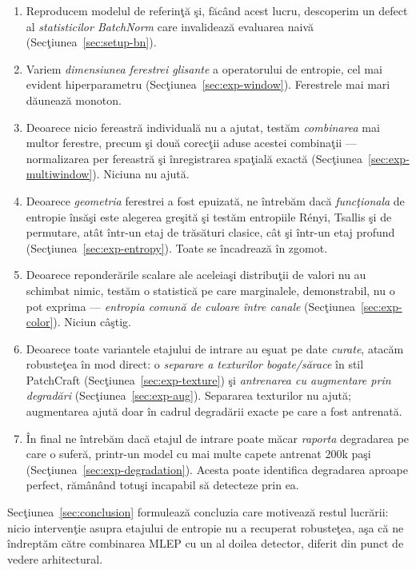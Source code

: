 \begin{enumerate}
  \item Reproducem modelul de referinţă şi, făcând acest lucru, descoperim un
        defect al \emph{statisticilor BatchNorm} care invalidează evaluarea
        naivă (Secţiunea~\ref{sec:setup-bn}).
  \item Variem \emph{dimensiunea ferestrei glisante} a operatorului de entropie,
        cel mai evident hiperparametru (Secţiunea~\ref{sec:exp-window}).
        Ferestrele mai mari dăunează monoton.
  \item Deoarece nicio fereastră individuală nu a ajutat, testăm
        \emph{combinarea} mai multor ferestre, precum şi două corecţii aduse
        acestei combinaţii --- normalizarea per fereastră şi înregistrarea
        spaţială exactă (Secţiunea~\ref{sec:exp-multiwindow}). Niciuna nu ajută.
  \item Deoarece \emph{geometria} ferestrei a fost epuizată, ne întrebăm dacă
        \emph{funcţionala} de entropie însăşi este alegerea greşită şi testăm
        entropiile Rényi, Tsallis şi de permutare, atât într-un etaj de
        trăsături clasice, cât şi într-un etaj profund
        (Secţiunea~\ref{sec:exp-entropy}). Toate se încadrează în zgomot.
  \item Deoarece reponderările scalare ale aceleiaşi distribuţii de valori nu au
        schimbat nimic, testăm o statistică pe care marginalele, demonstrabil,
        nu o pot exprima --- \emph{entropia comună de culoare între canale}
        (Secţiunea~\ref{sec:exp-color}). Niciun câştig.
  \item Deoarece toate variantele etajului de intrare au eşuat pe date
        \emph{curate}, atacăm robusteţea în mod direct: o \emph{separare a
        texturilor bogate/sărace} în stil PatchCraft
        (Secţiunea~\ref{sec:exp-texture}) şi \emph{antrenarea cu augmentare prin
        degradări} (Secţiunea~\ref{sec:exp-aug}). Separarea texturilor nu ajută;
        augmentarea ajută doar în cadrul degradării exacte pe care a fost
        antrenată.
  \item În final ne întrebăm dacă etajul de intrare poate măcar \emph{raporta}
        degradarea pe care o suferă, printr-un model cu mai multe capete
        antrenat 200k paşi (Secţiunea~\ref{sec:exp-degradation}). Acesta poate
        identifica degradarea aproape perfect, rămânând totuşi incapabil să
        detecteze prin ea.
\end{enumerate}

Secţiunea~\ref{sec:conclusion} formulează concluzia care motivează restul
lucrării: nicio intervenţie asupra etajului de entropie nu a recuperat
robusteţea, aşa că ne îndreptăm către combinarea MLEP cu un al doilea detector,
diferit din punct de vedere arhitectural.

